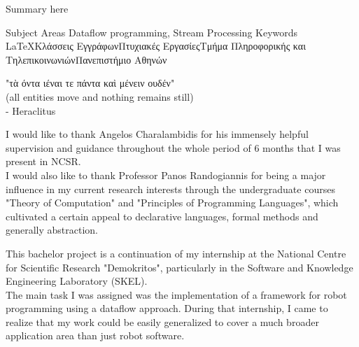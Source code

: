 \documentclass{dithesis}
\begin{document}
\maketitle

\begin{thesisabstract}[Abstract]
Summary here

\thesiskeywords
{Subject Areas}
	{Dataflow programming, Stream Processing}
{Keywords}
	{\LaTeX{}}{Κλάσσεις Εγγράφων}{Πτυχιακές Εργασίες}{Τμήμα Πληροφορικής και Τηλεπικοινωνιών}{Πανεπιστήμιο Αθηνών}
\end{thesisabstract}

\begin{thesisdedication}
"{τὰ όντα ιέναι τε πάντα καὶ μένειν ουδέν}" \\
(all entities move and nothing remains still) \\
- Heraclitus
\end{thesisdedication}

\begin{thesisacknowledgments}[Acknowledgements]
I would like to thank Angelos Charalambidis for his immensely helpful supervision and guidance throughout the whole period of 6 months that I was present in NCSR. \\
I would also like to thank Professor Panos Randogiannis for being a major influence in my current research interests through the undergraduate courses "Theory of Computation" and "Principles of Programming Languages", which cultivated a certain appeal to declarative languages, formal methods and generally abstraction.
\end{thesisacknowledgments}

\tableofcontents
\listoffigures
\listoftables

\begin{thesisprologue}[Prologue]
This bachelor project is a continuation of my internship at the National Centre for Scientific Research "Demokritos", particularly in the Software and Knowledge Engineering Laboratory (SKEL). \\
The main task I was assigned was the implementation of a framework for robot programming using a dataflow approach. During that internship, I came to realize that my work could be easily generalized to cover a much broader application area than just robot software.
\end{thesisprologue}
\end{document}
